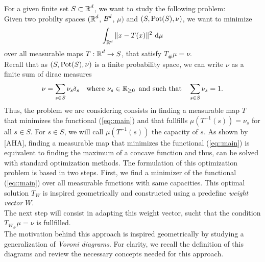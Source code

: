\documentclass[
     12pt,         %
     a4paper,      %
     BCOR=10mm,     %
     DIV=14,        %
     ]{scrreprt}
\begin{document}
     
    

    
    For a given finite set $S \subset \operatorname{\mathbb{R}}^d$, we want to study the following problem: \\ 
    Given two probilty spaces $(\operatorname{\mathbb{R}}^d$, $\operatorname{\mathcal{B}}^d$, $\mu)$ and $(S, \operatorname{Pot}(S), \nu)$, we want to minimize 
    \begin{align} \label{eq::main}
        \int_{\operatorname{\mathbb{R}}^d} \|x-T(x) \|^2 \ {\operatorname{{\mathrm{d}}}} \mu  
    \end{align}
    over all measurable maps $T: \operatorname{\mathbb{R}}^d \to S$, that satisfy $T_{\#}\mu = \nu$. \\%
    Recall that as $(S, \operatorname{Pot}(S), \nu)$ is a finite probability space, we can write $\nu$ as a finite sum of dirac measures
    \begin{align} \label{eq::dirac} 
        \nu = \sum_{s\in S} {\nu_s \delta_{s}} \quad \text{where   } \nu_s \in \operatorname{\mathbb{R}}_{\ge 0} \text{   and such that} \quad \sum_{s \in S}{\nu_s} = 1. 
    \end{align}
    Thus, the problem we are considering consists in finding a measurable map $T$ that minimizes the functional (\ref{eq::main}) and that fullfills 
    $\mu (T^{-1}(s)) = \nu_s$ for all $s\in S$. For $s\in S$, we will call $\mu(T^{-1}(s)) $ the capacity of $s$.
    \indent As shown by [AHA], finding a measurable map that minimizes the functional (\ref{eq::main}) is equivalent to finding the maximum of a concave function and thus, can be solved with
    standard optimization methods. The formulation of this optimization problem is based in two steps.
    First, we find a minimizer of the functional (\ref{eq::main}) over all measurable functions with same capacities.  This optimal solution $T_W$ is inspired geometrically and constructed using 
    a predefine \textit{weight vector} $W$.\\
    The next step will consist in adapting this weight vector, sucht that the condition $T_{W_{\#}}\mu = \nu$ is fullfilled.\\ 
    The motivation behind this approach is inspired geometrically by studying a generalization of \textit{Voroni diagrams}. 
    For clarity, we recall the definition of this diagrams and review the necessary concepts needed for this approach. 
\end{document}
